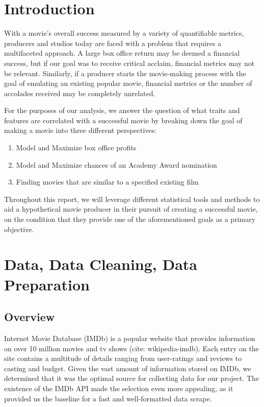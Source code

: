 \documentclass[10pt]{article}
\begin{document}
\section{Introduction}

With a movie’s overall success measured by a variety of quantifiable metrics, producers and studios today are faced with a problem that requires a multifaceted approach. A large box office return may be deemed a financial success, but if our goal was to receive critical acclaim, financial metrics may not be relevant. Similarly, if a producer starts the movie-making process with the goal of emulating an existing popular movie, financial metrics or the number of accolades received may be completely unrelated. 

For the purposes of our analysis, we answer the question of what traits and features are correlated with a successful movie by breaking down the goal of making a movie into three different perspectives:

\begin{enumerate}
\item Model and Maximize box office profits
\item Model and Maximize chances of an Academy Award nomination
\item Finding movies that are similar to a specified existing film
\end{enumerate}

Throughout this report, we will leverage different statistical tools and methods to aid a hypothetical movie producer in their pursuit of creating a successful movie, on the condition that they provide one of the aforementioned goals as a primary objective.


\section{Data, Data Cleaning, Data Preparation}

\subsection{Overview}

Internet Movie Database (IMDb) is a popular website that provides information on over 10 million movies and tv shows (cite: wikipedia-imdb). Each entry on the site contains a multitude of details ranging from user-ratings and reviews to casting and budget. Given the vast amount of information stored on IMDb, we determined that it was the optimal source for collecting data for our project. The existence of the IMDb API made the selection even more appealing, as it provided us the baseline for a fast and well-formatted data scrape.  
\end{document}
